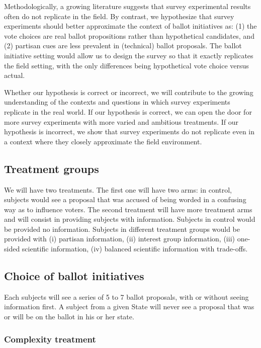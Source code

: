 \documentclass[12pt,final,fleqn]{article}
\theoremstyle{plain}
\begin{document}
Methodologically, a growing literature suggests that survey experimental results often do not replicate in the field. By contrast, we hypothesize that survey experiments should better approximate the context of ballot initiatives as: (1) the vote choices are real ballot propositions rather than hypothetical candidates, and (2) partisan cues are less prevalent in (technical) ballot proposals. The ballot initiative setting would allow us to design the survey so that it exactly replicates the field setting, with the only differences being hypothetical vote choice versus actual.
 
Whether our hypothesis is correct or incorrect, we will contribute to the growing understanding of the contexts and questions in which survey experiments replicate in the real world. If our hypothesis is correct, we can open the door for more survey experiments with more varied and ambitious treatments. If our hypothesis is incorrect, we show that survey experiments do not replicate even in a context where they closely approximate the field environment.


\subsection{Treatment groups} \label{sec: treatment_groups}

We will have two treatments. The first one will have two arms: in control, subjects would see a proposal that was accused of being worded in a confusing way as to influence voters. 
The second treatment will have more treatment arms and will consist in providing subjects with information. Subjects in control would be provided no information. Subjects in different treatment groups would be provided with (i) partisan information, (ii) interest group information, (iii) one-sided scientific information, (iv) balanced scientific information with trade-offs. 

\subsection{Choice of ballot initiatives} \label{sec: treatment_groups}

Each subjects will see a series of 5 to 7 ballot proposals, with or without seeing information first. A subject from a given State will never see a proposal that was or will be on the ballot in his or her state. 

\subsubsection{Complexity treatment} \label{sec: complexity-treatment}
\end{document}
